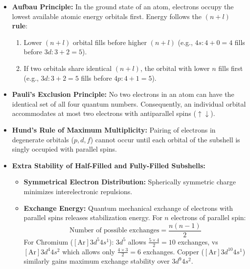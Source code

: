 \documentclass[10pt,a4paper]{article}
\begin{document}
\begin{conceptbox}
\begin{itemize}
  \item \textbf{Aufbau Principle:} In the ground state of an atom, electrons occupy the lowest available atomic energy orbitals first. Energy follows the \textbf{$(n+l)$ rule}:
  \begin{enumerate}
    \item Lower $(n+l)$ orbital fills before higher $(n+l)$ (e.g., $4s: 4+0=4$ fills before $3d: 3+2=5$).
    \item If two orbitals share identical $(n+l)$, the orbital with lower $n$ fills first (e.g., $3d: 3+2=5$ fills before $4p: 4+1=5$).
  \end{enumerate}
  \item \textbf{Pauli's Exclusion Principle:} No two electrons in an atom can have the identical set of all four quantum numbers. Consequently, an individual orbital accommodates at most two electrons with antiparallel spins ($\uparrow\downarrow$).
  \item \textbf{Hund's Rule of Maximum Multiplicity:} Pairing of electrons in degenerate orbitals ($p, d, f$) cannot occur until each orbital of the subshell is singly occupied with parallel spins.
  \item \textbf{Extra Stability of Half-Filled and Fully-Filled Subshells:}
  \begin{itemize}
    \item \textbf{Symmetrical Electron Distribution:} Spherically symmetric charge minimizes interelectronic repulsions.
    \item \textbf{Exchange Energy:} Quantum mechanical exchange of electrons with parallel spins releases stabilization energy. For $n$ electrons of parallel spin:
    \begin{equation}
      \text{Number of possible exchanges} = \frac{n(n-1)}{2}
    \end{equation}
    For Chromium ($[\mathrm{Ar}] 3d^5 4s^1$): $3d^5$ allows $\frac{5\times 4}{2} = 10$ exchanges, vs $[\mathrm{Ar}] 3d^4 4s^2$ which allows only $\frac{4\times 3}{2} = 6$ exchanges. Copper ($[\mathrm{Ar}] 3d^{10} 4s^1$) similarly gains maximum exchange stability over $3d^9 4s^2$.
  \end{itemize}
\end{itemize}
\end{conceptbox}

\end{document}
